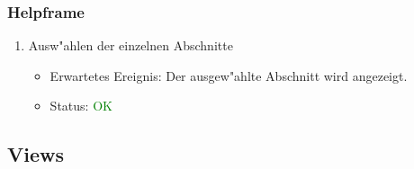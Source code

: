 \subsubsection{Helpframe}
\begin{enumerate}
\item Ausw"ahlen der einzelnen Abschnitte
\begin{itemize}
\item Erwartetes Ereignis: Der ausgew"ahlte Abschnitt wird angezeigt.
\item Status: \textcolor{green}{OK}
\end{itemize}
\end{enumerate}

\subsection{Views}
